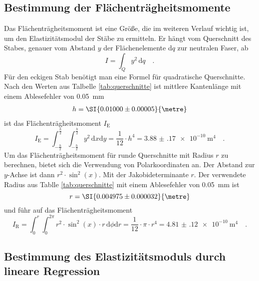 \subsection{Bestimmung der Flächenträgheitsmomente}
Das Flächenträgheitsmoment ist eine Größe, die im weiteren Verlauf wichtig ist, um den Elastizitätsmodul der Stäbe zu ermitteln.
Er hängt vom Querschnitt des Stabes, genauer vom Abstand $y$ der Flächenelemente d$q$ zur neutralen Faser, ab
\begin{equation}
I = \int_{Q} y ^2 \, \text{d}q \quad .
\end{equation}
Für den eckigen Stab benötigt man eine Formel für quadratische Querschnitte. Nach den Werten aus Talbelle \ref{tab:querschnitte} ist mittlere Kantenlänge mit einem Ablesefehler von \SI{0.05}{\milli\metre}
\begin{align}
  h = \SI{0.01000 \pm 0.00005}{\metre}
\end{align}
ist das Flächenträgheitsmoment $I_\text{E}$
\begin{equation}
I_\text{E} = \int_{-\frac{h}{2}}^{\frac{h}{2}} \int_{-\frac{h}{2}}^{\frac{h}{2}} y^2\,  \text{d}x \text{d}y = \frac{1}{12} \cdot h^4 = \SI{3.88(17)e-10}{\metre^{4}} \quad .
\label{I_E}
\end{equation}
Um das Flächenträgheitsmoment für runde Querschnitte mit Radius $r$ zu berechnen, bietet sich die Verwendung von Polarkoordinaten an. Der Abstand zur $y$-Achse ist dann $r^2 \cdot \sin^2(x)$.  Mit der Jakobideterminante $r$. Der verwendete Radius aus Tablle \ref{tab:querschnitte} mit einem Ablesefehler von \SI{0.05}{\milli\metre} ist
\begin{equation}
  r = \SI{0.004975 \pm 0.000032}{\metre}
\end{equation}
und führ auf das Flächenträgheitsmoment
\begin{equation}
I_\text{R} = \int_{0}^{r}  \int_{0}^{2\pi} r^2 \cdot \sin^2(x) \cdot r  \, \text{d}\phi \text{d}r = \frac{1}{12}\cdot \pi \cdot r^4 = \SI{4.81(12)e-10}{\metre^{4}} \quad .
\label{I_R}
\end{equation}







\subsection{Bestimmung des Elastizitätsmoduls durch lineare Regression}
